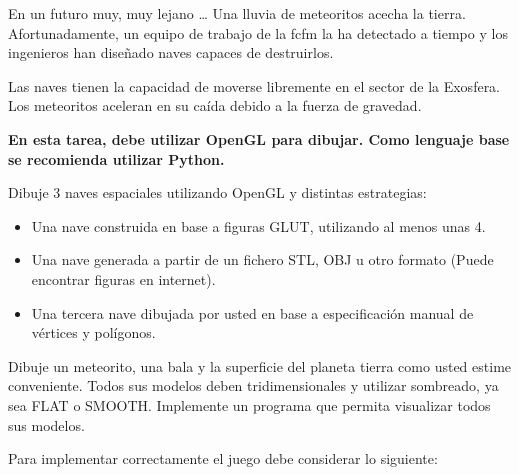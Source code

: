 \documentclass[letterpaper,11pt]{article} %
\begin{document}




En un futuro muy, muy lejano …
\newp 
Una lluvia de meteoritos acecha la tierra. Afortunadamente, un equipo de trabajo de la fcfm la ha detectado a tiempo y los ingenieros han diseñado naves capaces de destruirlos.

\newp Las naves tienen la capacidad de moverse libremente en el sector de la Exosfera. Los meteoritos aceleran en su caída debido a la fuerza de gravedad. \\


\textbf{En esta tarea, debe utilizar OpenGL para dibujar. Como lenguaje base se recomienda utilizar Python.}


Dibuje 3 naves espaciales utilizando OpenGL y distintas estrategias:

\begin{itemize}
	\item Una nave construida en base a figuras GLUT, utilizando al menos unas 4.
	\item Una nave generada a partir de un fichero STL, OBJ u otro formato (Puede encontrar figuras en internet).
	\item Una tercera nave dibujada por usted en base a especificación manual de vértices y polígonos.
\end{itemize}

Dibuje un meteorito, una bala y la superficie del planeta tierra como usted estime conveniente. Todos sus modelos deben tridimensionales y utilizar sombreado, ya sea FLAT o SMOOTH. Implemente un programa que permita visualizar todos sus modelos.


Para implementar correctamente el juego debe considerar lo siguiente:
\end{document}
